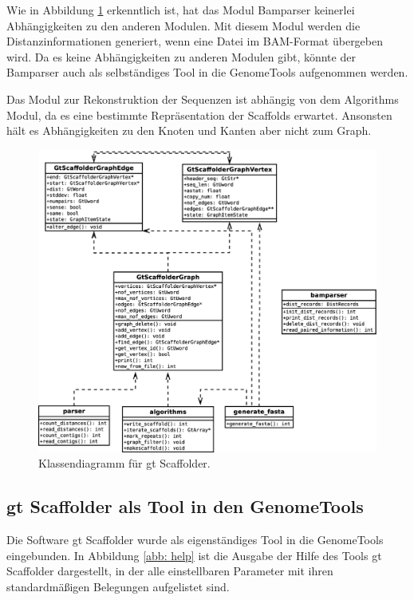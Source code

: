 \documentclass[a4paper,11pt,parskip]{scrartcl}
\begin{document}
Wie in Abbildung \ref{abb: UML} erkenntlich ist, hat das Modul
Bamparser keinerlei Abhängigkeiten zu den anderen Modulen. Mit diesem
Modul werden die Distanzinformationen generiert, wenn eine Datei im
BAM-Format übergeben wird. Da es keine Abhängigkeiten zu anderen
Modulen gibt, könnte der Bamparser auch als selbständiges Tool in die
GenomeTools aufgenommen werden.

Das Modul zur Rekonstruktion der Sequenzen ist abhängig von dem
Algorithms Modul, da es eine bestimmte Repräsentation der Scaffolds
erwartet. Ansonsten hält es Abhängigkeiten zu den Knoten und Kanten
aber nicht zum Graph.

\begin{figure}
  \centering
  \includegraphics[width=1\linewidth]{uml2.eps}
  \caption{Klassendiagramm für gt Scaffolder.}
\label{abb: UML}
\end{figure}

\subsection{gt Scaffolder als Tool in den GenomeTools}
Die Software gt Scaffolder wurde als eigenständiges Tool in die GenomeTools
eingebunden. In Abbildung \ref{abb: help} ist die Ausgabe der Hilfe des Tools
gt Scaffolder dargestellt, in der alle einstellbaren Parameter mit ihren
standardmäßigen Belegungen aufgelistet sind.
\end{document}
